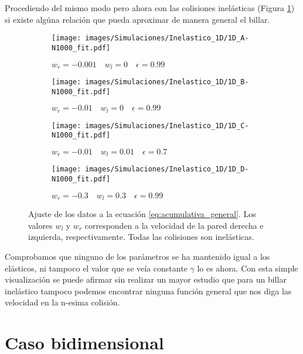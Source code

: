 \vspace{3mm}

Procediendo del mismo modo pero ahora con las colisiones inelásticas (Figura \ref{fig:ajuste_1D_inelastic}) si existe algúna relación que pueda aproximar de manera general el billar. 

\begin{figure}[h]
    \begin{subfigure}[b]{0.5\textwidth}
        \centering
        \texttt{[image: images/Simulaciones/Inelastico\_1D/1D\_A-N1000\_fit.pdf]}
        \caption{$w_r = -0.001 \quad w_l = 0 \quad \epsilon = 0.99$}
    \end{subfigure}
    \hfill
    \begin{subfigure}[b]{0.5\textwidth}
        \centering
        \texttt{[image: images/Simulaciones/Inelastico\_1D/1D\_B-N1000\_fit.pdf]}
        \caption{$w_r = -0.01 \quad w_l = 0 \quad \epsilon = 0.99$}
    \end{subfigure}
    \hfill
    \begin{subfigure}[b]{0.5\textwidth}
        \centering
        \texttt{[image: images/Simulaciones/Inelastico\_1D/1D\_C-N1000\_fit.pdf]}
        \caption{$w_r = -0.01 \quad w_l = 0.01 \quad \epsilon = 0.7$}
    \end{subfigure}
    \hfill
    \begin{subfigure}[b]{0.5\textwidth}
        \centering
        \texttt{[image: images/Simulaciones/Inelastico\_1D/1D\_D-N1000\_fit.pdf]}
        \caption{$w_r = -0.3 \quad w_l = 0.3 \quad \epsilon = 0.99$}
    \end{subfigure}
    \caption{Ajuste de los datos a la ecuación \ref{eq:acumulativa_general}. Los valores \( w_l \) y \( w_r \) corresponden a la velocidad de la pared derecha e izquierda, respectivamente. Todas las colisiones son  inelásticas.}
    \label{fig:ajuste_1D_inelastic}
\end{figure}

\vspace{3mm}

Comprobamos que ninguno de los parámetros se ha mantenido igual a los elásticos, ni tampoco el valor que se veía constante \( \gamma \) lo es ahora. Con esta simple visualización se puede afirmar sin realizar un mayor estudio que para un billar inelástico tampoco podemos encontrar ninguna función general que nos diga las velocidad en la n-esima colisión. 


\section{Caso bidimensional}

